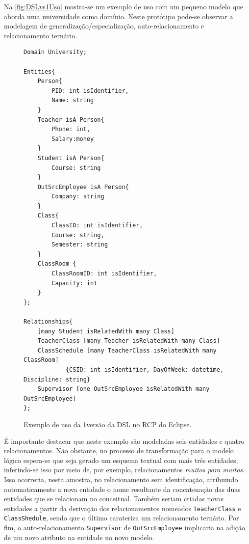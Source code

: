 
Na \autoref{fig:DSLvs1Uso} mostra-se um exemplo de uso com um pequeno modelo que aborda uma universidade como domínio. 
Neste protótipo pode-se observar a modelagem de generalização/especialização, auto-relacionamento e relacionamento ternário.

\lstset{basicstyle=\scriptsize}
\begin{figure}[!htb]
\centering
\caption{Exemplo de uso da 1\degree versão da DSL no RCP do Eclipse.}
\label{fig:DSLvs1Uso}
\begin{scriptsize}
\begin{lstlisting}[language = ERDSL, frame = trbl]
Domain University;

Entities{
	Person{ 
		PID: int isIdentifier, 
		Name: string
	}
	Teacher isA Person{ 
		Phone: int,
		Salary:money
	}
	Student isA Person{ 
		Course: string
	} 	
	OutSrcEmployee isA Person{
	    Company: string
	}
	Class{
		ClassID: int isIdentifier,
		Course: string,
		Semester: string
	}
	ClassRoom {
		ClassRoomID: int isIdentifier,
		Capacity: int
	}
};

Relationships{	 
	[many Student isRelatedWith many Class]
	TeacherClass [many Teacher isRelatedWith many Class]
	ClassSchedule [many TeacherClass isRelatedWith many ClassRoom]
	        {CSID: int isIdentifier, DayOfWeek: datetime, Discipline: string}
	Supervisor [one OutSrcEmployee isRelatedWith many OutSrcEmployee]
};
\end{lstlisting}
\end{scriptsize}
\end{figure}
É importante destacar que neste exemplo são modeladas seis entidades e quatro relacionamentos. 
Não obstante, no processo de transformação para o modelo lógico espera-se que seja gerado um esquema textual com mais três entidades, inferindo-se isso por meio de, por exemplo, relacionamentos \textit{muitos para muitos}. 
Isso ocorreria, nesta amostra, no relacionamento sem identificação, atribuindo automaticamente a nova entidade o nome resultante da concatenação das duas entidades que se relacionam no conceitual. 
Também seriam criadas novas entidades a partir da derivação dos relacionamentos nomeados \texttt{TeacherClass} e \texttt{ClassShedule}, sendo que o último carateriza um relacionamento ternário.
Por fim, o auto-relacionamento \texttt{Supervisor} de \texttt{OutSrcEmployee} implicaria na adição de um novo atributo na entidade no novo modelo.

